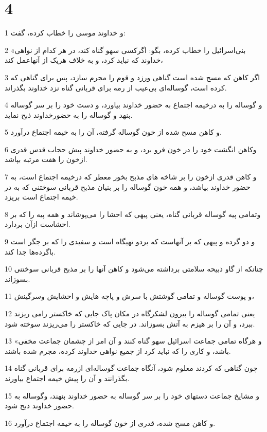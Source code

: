 \chapter{4}

\par 1 و خداوند موسی را خطاب کرده، گفت:
\par 2 «بنی‌اسرائیل را خطاب کرده، بگو: اگرکسی سهو گناه کند، در هر کدام از نواهی خداوند که نباید کرد، و به خلاف هریک از آنهاعمل کند،
\par 3 اگر کاهن که مسح شده است گناهی ورزد و قوم را مجرم سازد، پس برای گناهی که کرده است، گوساله‌ای بی‌عیب از رمه برای قربانی گناه نزد خداوند بگذراند.
\par 4 و گوساله را به درخیمه اجتماع به حضور خداوند بیاورد، و دست خود را بر سر گوساله بنهد و گوساله را به حضورخداوند ذبح نماید.
\par 5 و کاهن مسح شده از خون گوساله گرفته، آن را به خیمه اجتماع درآورد.
\par 6 وکاهن انگشت خود را در خون فرو برد، و به حضور خداوند پیش حجاب قدس قدری ازخون را هفت مرتبه بپاشد.
\par 7 و کاهن قدری ازخون را بر شاخه های مذبح بخور معطر که درخیمه اجتماع است، به حضور خداوند بپاشد، و همه خون گوساله را بر بنیان مذبح قربانی سوختنی که به در خیمه اجتماع است بریزد.
\par 8 وتمامی پیه گوساله قربانی گناه، یعنی پیهی که احشا را می‌پوشاند و همه پیه را که بر احشاست ازآن بردارد.
\par 9 و دو گرده و پیهی که بر آنهاست که بردو تهیگاه است و سفیدی را که بر جگر است باگرده‌ها جدا کند.
\par 10 چنانکه از گاو ذبیحه سلامتی برداشته می‌شود و کاهن آنها را بر مذبح قربانی سوختنی بسوزاند.
\par 11 و پوست گوساله و تمامی گوشتش با سرش و پاچه هایش و احشایش وسرگینش،
\par 12 یعنی تمامی گوساله را بیرون لشکرگاه در مکان پاک جایی که خاکستر رامی ریزند ببرد، و آن را بر هیزم به آتش بسوزاند. در جایی که خاکستر را می‌ریزند سوخته شود.
\par 13 «و هرگاه تمامی جماعت اسرائیل سهو گناه کنند و آن امر از چشمان جماعت مخفی باشد، و کاری را که نباید کرد از جمیع نواهی خداوند کرده، مجرم شده باشند.
\par 14 چون گناهی که کردند معلوم شود، آنگاه جماعت گوساله‌ای ازرمه برای قربانی گناه بگذرانند و آن را پیش خیمه اجتماع بیاورند.
\par 15 و مشایخ جماعت دستهای خود را بر سر گوساله به حضور خداوند بنهند، وگوساله به حضور خداوند ذبح شود.
\par 16 و کاهن مسح شده، قدری از خون گوساله را به خیمه اجتماع درآورد.
